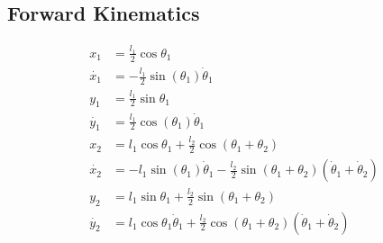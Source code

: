 \subsection*{Forward Kinematics}
\begin{align}
	x_1 &= \frac{l_1}{2}\cos\theta_1\nonumber \\
	\dot{x_1} &= -\frac{l_1}{2}\sin(\theta_1)\dot{\theta}_1\nonumber \\
	y_1 &= \frac{l_1}{2}\sin\theta_1\nonumber \\
	\dot{y_1} &= \frac{l_1}{2}\cos(\theta_1)\dot{\theta}_1\nonumber \\
	x_2 &= l_1\cos\theta_1 + \frac{l_2}{2}\cos(\theta_1 + \theta_2)\nonumber \\
	\dot{x_2} &= -l_1\sin(\theta_1)\dot{\theta}_1 - \frac{l_2}{2}\sin(\theta_1 + \theta_2)(\dot{\theta}_1 + \dot{\theta}_2)\label{eqn:x2dot} \\
	y_2 &= l_1\sin\theta_1 + \frac{l_2}{2}\sin(\theta_1 + \theta_2)\nonumber \\
	\dot{y_2} &= l_1\cos\theta_1\dot{\theta}_1 + \frac{l_2}{2}\cos(\theta_1 + \theta_2)(\dot{\theta}_1 + \dot{\theta}_2)\label{eqn:y2dot}
\end{align}  
